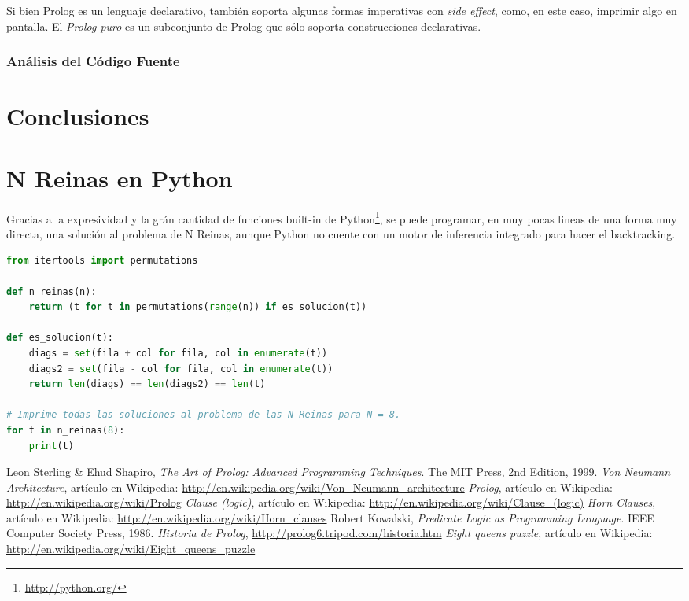 \documentclass[12pt,titlepage]{article}
\begin{document}
Si bien Prolog es un lenguaje declarativo, también soporta algunas formas imperativas con \emph{side effect}, como, en este caso, imprimir algo en pantalla. El \emph{Prolog puro} es un subconjunto de Prolog que sólo soporta construcciones declarativas.


\subsubsection{Análisis del Código Fuente}

\newpage
\section{Conclusiones}

\newpage
\appendix
\section{N Reinas en Python}
\label{sec:nreinaspython}

Gracias a la expresividad y la grán cantidad de funciones built-in de Python\footnote{\url{http://python.org/}}, se puede programar, en muy pocas lineas de una forma muy directa, una solución al problema de N Reinas, aunque Python no cuente con un motor de inferencia integrado para hacer el backtracking.

\begin{lstlisting}[language=Python]
from itertools import permutations

def n_reinas(n):
    return (t for t in permutations(range(n)) if es_solucion(t))
    
def es_solucion(t):
    diags = set(fila + col for fila, col in enumerate(t))
    diags2 = set(fila - col for fila, col in enumerate(t))
    return len(diags) == len(diags2) == len(t)

# Imprime todas las soluciones al problema de las N Reinas para N = 8.        
for t in n_reinas(8):
    print(t)
\end{lstlisting}

\clearpage
\begin{thebibliography}{9}
     Leon Sterling \& Ehud Shapiro, \emph{The Art of Prolog: Advanced Programming Techniques}. The MIT Press, 2nd Edition, 1999.
     \emph{Von Neumann Architecture}, artículo en Wikipedia: \url{http://en.wikipedia.org/wiki/Von\_Neumann\_architecture}
     \emph{Prolog}, artículo en Wikipedia: \url{http://en.wikipedia.org/wiki/Prolog}
     \emph{Clause (logic)}, artículo en Wikipedia: \url{http://en.wikipedia.org/wiki/Clause_(logic)}
     \emph{Horn Clauses}, artículo en Wikipedia: \url{http://en.wikipedia.org/wiki/Horn_clauses}
     Robert Kowalski, \emph{Predicate Logic as Programming Language}. IEEE Computer Society Press, 1986.
     \emph{Historia de Prolog}, \url{http://prolog6.tripod.com/historia.htm}
     \emph{Eight queens puzzle}, artículo en Wikipedia: \url{http://en.wikipedia.org/wiki/Eight_queens_puzzle}
\end{thebibliography} 

\end{document}
